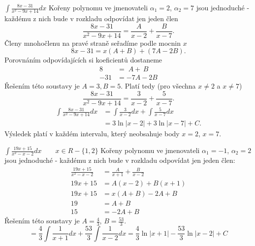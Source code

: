 {      \begin{example}$\displaystyle\int{\frac{8x-31}{x^2-9x+14}}dx$\cite[s.~90]{Knichal}\newline
        Kořeny polynomu ve jmenovateli $\alpha_1 = 2$, $\alpha_2 = 7$ jsou jednoduché - každému z
        nich bude v rozkladu odpovídat jen jeden člen $$\frac{8x-31}{x^2-9x+14} = \frac{A}{x-2}
        + \frac{B}{x-7}.$$ Členy mnohočlenu na pravé straně seřadíme podle mocnin $x$ $$8x-31 =
         x(A+B)+(7A-2B).$$ Porovnáním odpovídajících si koeficientů dostaneme
        \begin{align*}
          8   &=   \; A + \, B \\
          -31 &= -7A - 2B
        \end{align*}
        Řešením této soustavy je $A = 3, B = 5$. Platí tedy (pro všechna $x \neq 2$ a $x \neq 7$)
        $$\frac{8x-31}{x^2-9x+14} = \frac{3}{x-2} + \frac{5}{x-7}.$$
        \begin{align*}
          \int{\frac{8x-31}{x^2-9x+14}}dx 
            &= \int{\frac{3}{x-2}}dx + \int{\frac{5}{x-7}}dx      \\
            &= 3\ln|x-2| + 3\ln|x-7| + C.
        \end{align*}
        Výsledek platí v každém intervalu, který neobsahuje body \(x = 2\), \(x = 7\).
      \end{example}
      
      \begin{example}\label{MA:eq_ex1}$\displaystyle\int{\frac{19x+15}{x^2-x-2}}dx \qquad 
      x\in
        R-\{1,2\} $ \newline Kořeny polynomu ve jmenovateli $\alpha_1 = -1$, $\alpha_2 = 2$ jsou
        jednoduché - každému z nich bude v rozkladu odpovídat jen jeden člen: 
        \begin{align*}
          \frac{19x+15}{x^2-x-2}     &= \frac{A}{x+1} + \frac{B}{x-2} \\
                           19x +15   &= A(x-2) + B(x+1)               \\
                           19x +15   &= x(A+B) - 2A + B               \\
                           19        &= A + B                         \\
                                15   &=        - 2A + B
        \end{align*}              
        Řešením této soustavy je $A = \frac{4}{3}$, $B = \frac{53}{3}$.
        \begin{equation*}
          = \frac{4}{3}\int{\frac{1}{x+1}}dx+\frac{53}{3}\int{\frac{1}{x-2}}dx 
          = \frac{4}{3}\ln|x+1| - \frac{53}{3}\ln|x-2| +  C
        \end{equation*}      
      \end{example}
  
}
